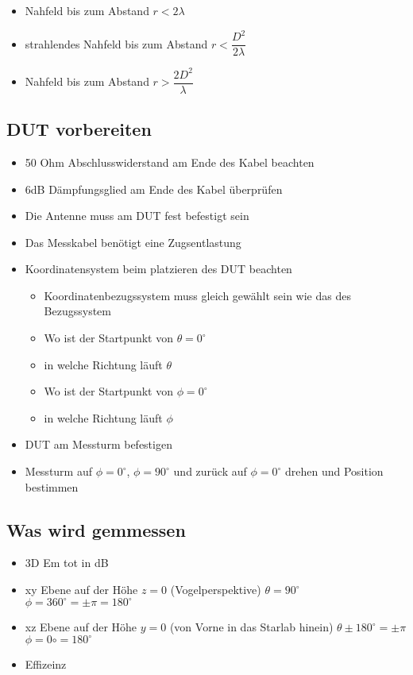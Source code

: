 	\begin{itemize}
	\item Nahfeld bis zum Abstand $r<2\lambda$
	\item strahlendes Nahfeld bis zum Abstand $r<\dfrac{D^2}{2\lambda}$
	\item Nahfeld bis zum Abstand $r>\dfrac{2D^2}{\lambda}$
\end{itemize}	 

	\subsection{DUT vorbereiten}
	\begin{itemize}
	\item 50 Ohm Abschlusswiderstand am Ende des Kabel beachten
	\item 6dB Dämpfungsglied am Ende des Kabel überprüfen
	\item Die Antenne muss am DUT fest befestigt sein
	\item Das Messkabel benötigt eine Zugsentlastung
	\item Koordinatensystem beim platzieren des DUT beachten
	\begin{itemize}
	\item Koordinatenbezugssystem muss gleich gewählt sein wie das des Bezugssystem
	\item Wo ist der Startpunkt von $\theta=0^\circ$
	\item in welche Richtung läuft $\theta$
	\item Wo ist der Startpunkt von $\phi=0^\circ$
	\item in welche Richtung läuft $\phi$
	\end{itemize}
	\item DUT am Messturm befestigen 
	\item Messturm auf $\phi=0^\circ$, $\phi=90^\circ$ und zurück auf $\phi=0^\circ$ drehen und Position bestimmen
	\end{itemize}
\subsection{Was wird gemmessen}
\begin{itemize}
	\item 3D Em tot in dB
	\item xy Ebene auf der Höhe $z=0$ (Vogelperspektive) $\theta=90^\circ$ $\phi=360^\circ= \pm \pi=180^\circ$
	\item xz Ebene auf der Höhe $y=0$ (von Vorne in das Starlab hinein) $\theta\pm 180^\circ =\pm \pi$ $\phi= 0\circ = 180^\circ$
	\item Effizeinz
\end{itemize}

